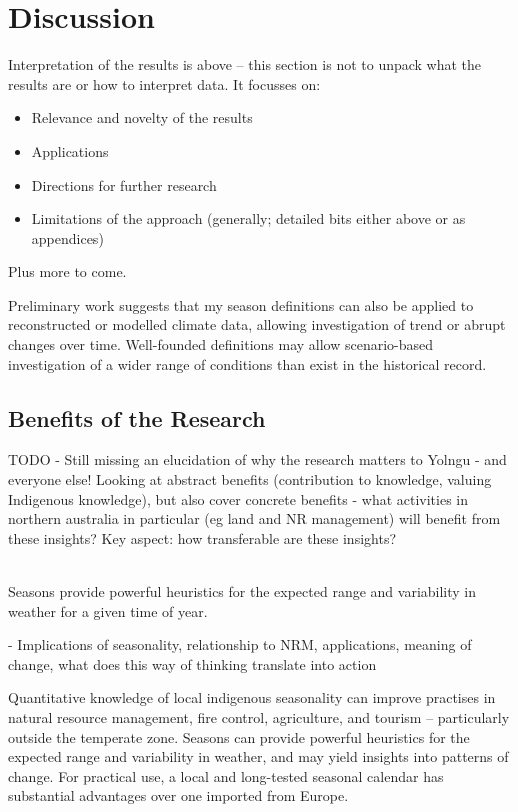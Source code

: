 \chapter{Discussion}

Interpretation of the results is above – this section is not to unpack what the results are or how to interpret data.  It focusses on:
\begin{itemize}
\item Relevance and novelty of the results
\item Applications
\item Directions for further research
\item Limitations of the approach (generally; detailed bits either above or as appendices)
\end{itemize}
Plus more to come.


Preliminary work suggests that my season definitions can also be applied to
reconstructed or modelled climate data, allowing investigation of trend
or abrupt changes over time. Well-founded definitions may allow scenario-based
investigation of a wider range of conditions than exist in the historical record.



\section{Benefits of the Research}
TODO - Still missing an elucidation of why the research matters to Yolngu -
and everyone else!
Looking at abstract benefits (contribution to knowledge, valuing Indigenous knowledge),
but also cover concrete benefits - what activities in northern australia
in particular (eg land and NR management) will benefit from these insights?
Key aspect: how transferable are these insights?

~\\

Seasons provide powerful heuristics for the expected range and variability in
weather for a given time of year.

-	Implications of seasonality, relationship to NRM, applications, meaning of
change, what does this way of thinking translate into action


Quantitative knowledge of local indigenous seasonality can improve practises in
natural resource management, fire control, agriculture, and tourism –
particularly outside the temperate zone.  Seasons can provide powerful
heuristics for the expected range and variability in weather, and may yield
insights into patterns of change.  For practical use, a local and long-tested
seasonal calendar has substantial advantages over one imported from Europe.


